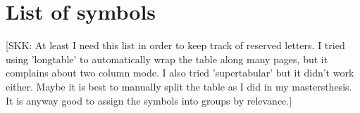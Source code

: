 \documentclass{aa}
\newcommand{\skk}[1]{\textcolor{midorange}{[SKK: #1]}} %
\begin{document}
%

\FloatBarrier

\section{List of symbols} \label{sect:sym}

\skk{At least I need this list in order to keep track of reserved letters. I tried using 'longtable' to automatically 
wrap the table along many pages, but it complains about two column mode. I also tried 'supertabular' but it didn't work 
either. Maybe it is best to manually split the table as I did in my mastersthesis. It is anyway good to assign the 
symbols into groups by relevance.}
\setlength{\extrarowheight}{3pt}
\def\tabularxcolumn#1{m{#1}}
\newcommand{\symtable}[2]{\begin{table} \caption{#1} \begin{tabularx}{\textwidth}{lX} #2 \end{tabularx} \end{table}}

\end{document}
